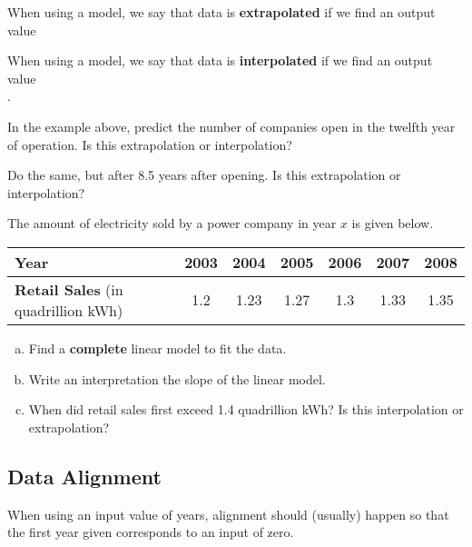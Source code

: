 \documentclass[notes]{subfiles}
\begin{document}
		\begin{defn}[Extrapolation]
			When using a model, we say that data is \textbf{extrapolated} if we find an output value\\[15pt] 

		\end{defn}
			\vspace{.25in}
		\begin{defn}[Interpolation]
			When using a model, we say that data is \textbf{interpolated} if we find an output value\\[15pt] .
		\end{defn}
		\begin{ex}
			In the example above, predict the number of companies open in the twelfth year of operation.  Is this extrapolation or interpolation?
		\end{ex}
		\begin{ex}
			Do the same, but after 8.5 years after opening.  Is this extrapolation or interpolation?
		\end{ex}
		\begin{ex}
			The amount of electricity sold by a power company in year $x$ is given below.
			\begin{center}
				{\renewcommand{\arraystretch}{1.2}
				\begin{tabular}{|l||c|c|c|c|c|c|} \hline
					\textbf{Year} & 2003 & 2004 & 2005 & 2006 & 2007 & 2008 \\ \hline
					\textbf{Retail Sales} (in quadrillion kWh) & 1.2 & 1.23 & 1.27 & 1.3 & 1.33 & 1.35\\ \hline
				\end{tabular}
				}
			\end{center}
			\begin{enumerate}[(a)]
				\item Find a \textbf{complete} linear model to fit the data.  
				\item Write an interpretation the slope of the linear model.
				\item When did retail sales first exceed 1.4 quadrillion kWh?  Is this interpolation or extrapolation?
			\end{enumerate}
		\end{ex}
			\newpage

	\subsection*{Data Alignment}
		When using an input value of years, alignment should (usually) happen so that the first year given corresponds to an input of zero.
\end{document}
